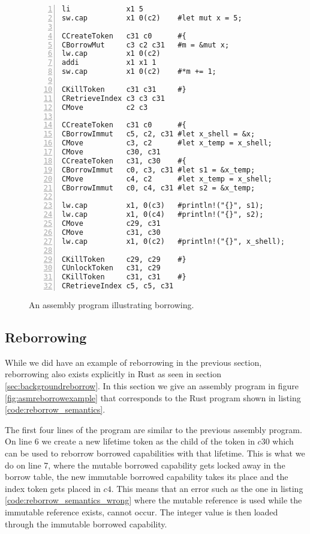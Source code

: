 \begin{figure}[h]
\begin{lstlisting}[style=custASM, numbers = left ,xleftmargin=1.5em]
li             x1 5
sw.cap         x1 0(c2)    #let mut x = 5;

CCreateToken   c31 c0      #{
CBorrowMut     c3 c2 c31   #m = &mut x;
lw.cap         x1 0(c2)
addi           x1 x1 1
sw.cap         x1 0(c2)    #*m += 1;

CKillToken     c31 c31     #}
CRetrieveIndex c3 c3 c31
CMove          c2 c3

CCreateToken   c31 c0      #{
CBorrowImmut   c5, c2, c31 #let x_shell = &x;
CMove          c3, c2      #let x_temp = x_shell;
CMove          c30, c31
CCreateToken   c31, c30    #{
CBorrowImmut   c0, c3, c31 #let s1 = &x_temp;
CMove          c4, c2      #let x_temp = x_shell;
CBorrowImmut   c0, c4, c31 #let s2 = &x_temp;

lw.cap         x1, 0(c3)   #println!("{}", s1);
lw.cap         x1, 0(c4)   #println!("{}", s2);
CMove          c29, c31
CMove          c31, c30
lw.cap         x1, 0(c2)   #println!("{}", x_shell);

CKillToken     c29, c29    #}
CUnlockToken   c31, c29
CKillToken     c31, c31    #}
CRetrieveIndex c5, c5, c31
\end{lstlisting}
\caption{An assembly program illustrating borrowing.}
\label{fig:asmborrowexample}
\end{figure}

\subsection{Reborrowing}
While we did have an example of reborrowing in the previous section, reborrowing also exists explicitly in Rust as seen in section \ref{sec:backgroundreborrow}.
In this section we give an assembly program in figure \ref{fig:asmreborrowexample} that corresponds to the Rust program shown in listing \ref{code:reborrow_semantics}.

The first four lines of the program are similar to the previous assembly program.
On line 6 we create a new lifetime token as the child of the token in $c30$ which can be used to reborrow borrowed capabilities with that lifetime.
This is what we do on line 7, where the mutable borrowed capability gets locked away in the borrow table, the new immutable borrowed capability takes its place and the index token gets placed in $c4$.
This means that an error such as the one in listing \ref{code:reborrow_semantics_wrong} where the mutable reference is used while the immutable reference exists, cannot occur.
The integer value is then loaded through the immutable borrowed capability.


